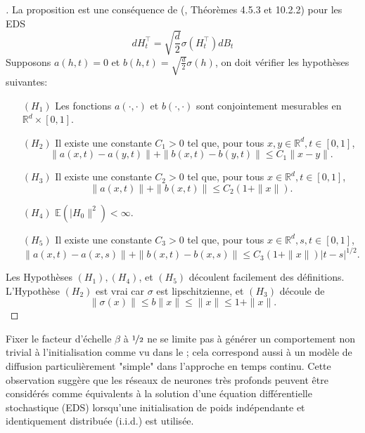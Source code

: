 \begin{proof}[]
    La proposition est une conséquence de \citeauthor{stochasticEqSolution} (\citeyear{stochasticEqSolution}, Théorèmes 4.5.3 et 10.2.2) pour les EDS
    $$
    d H_t^{\top}=\sqrt{\frac{d}{2}} \sigma\left(H_t^{\top}\right) d B_t
    $$
    Supposons $a(h, t)=0$ et $b(h, t)=\sqrt{\frac{d}{2}} \sigma(h)$, on doit vérifier les hypothèses suivantes:
    \begin{itemize}
        \item [$\left(H_1\right)$] Les fonctions $a(\cdot, \cdot)$ et $b(\cdot, \cdot)$ sont conjointement mesurables en $\mathbb{R}^d \times[0,1]$.
        \item [$\left(H_2\right)$] Il existe une constante  $C_1>0$ tel que, pour tous $x, y \in \mathbb{R}^d, t \in[0,1]$,
        $$
            \|a(x, t)-a(y, t)\|+\|b(x, t)-b(y, t)\| \leqslant C_1\|x-y\| .
        $$
        \item [$\left(H_3\right)$] Il existe une constante $C_2>0$ tel que, pour tous $x \in \mathbb{R}^d, t \in[0,1]$,
        $$
            \|a(x, t)\|+\|b(x, t)\| \leqslant C_2(1+\|x\|).
        $$
        \item [$\left(H_4\right)$] $\mathbb{E}\left(\mid H_0 \|^2\right)<\infty$.
        \item [$\left(H_5\right)$] Il existe une constante $C_3>0$ tel que, pour tous $x \in \mathbb{R}^d, s, t \in[0,1]$,
        $$
        \|a(x, t)-a(x, s)\|+\|b(x, t)-b(x, s)\| \leqslant C_3(1+\|x\|)|t-s|^{1 / 2} .
        $$
    \end{itemize}
    Les Hypothèses $\left(H_1\right),\left(H_4\right)$, et $\left(H_5\right)$ découlent facilement des définitions.
    L'Hypothèse $\left(H_2\right)$ est vrai car $\sigma$ est lipschitzienne, et $\left(H_3\right)$ découle de
    $$
        \|\sigma(x)\| \leqslant b\|x\| \leqslant\|x\| \leqslant 1+\|x\| .
    $$
\end{proof}

Fixer le facteur d'échelle $\beta$ à $\nicefrac{1}{2}$ ne se limite pas à générer un comportement non trivial à l'initialisation comme vu dans le ; cela correspond aussi à un modèle de diffusion particulièrement "simple" dans l'approche en temps continu. Cette observation suggère que les réseaux de neurones très profonds peuvent être considérés comme équivalents à la solution d'une équation différentielle stochastique (EDS) lorsqu'une initialisation de poids indépendante et identiquement distribuée (i.i.d.) est utilisée.


